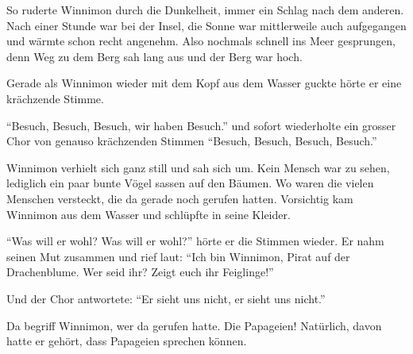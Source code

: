 So ruderte Winnimon durch die Dunkelheit, immer ein Schlag nach dem anderen. Nach einer Stunde war bei der Insel, die Sonne war mittlerweile auch aufgegangen und wärmte schon recht angenehm. Also nochmals schnell ins Meer gesprungen, denn Weg zu dem Berg sah lang aus und der Berg war hoch. 

Gerade als Winnimon wieder mit dem Kopf aus dem Wasser guckte hörte er eine krächzende Stimme.

\enquote{Besuch, Besuch, Besuch, wir haben Besuch.} und sofort wiederholte ein grosser Chor von genauso krächzenden Stimmen \enquote{Besuch, Besuch, Besuch, Besuch.}

Winnimon verhielt sich ganz still und sah sich um. Kein Mensch war zu sehen, lediglich ein paar bunte Vögel sassen auf den Bäumen. Wo waren die vielen Menschen versteckt, die da gerade noch gerufen hatten. Vorsichtig kam Winnimon aus dem Wasser und schlüpfte in seine Kleider.

\enquote{Was will er wohl? Was will er wohl?} hörte er die Stimmen wieder. Er nahm seinen Mut zusammen und rief laut: \enquote{Ich bin Winnimon, Pirat auf der Drachenblume. Wer seid ihr? Zeigt euch ihr Feiglinge!}

Und der Chor antwortete: \enquote{Er sieht uns nicht, er sieht uns nicht.}

Da begriff Winnimon, wer da gerufen hatte. Die Papageien! Natürlich, davon hatte er gehört, dass Papageien sprechen können. 






  \hfill {\color{red}\decofourleft}
